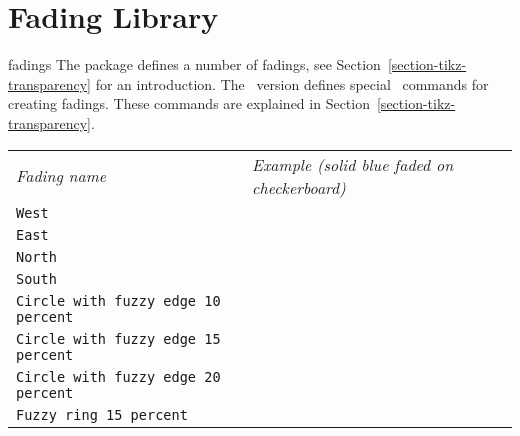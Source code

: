 %
%
%


\section{Fading Library}
\label{section-library-fadings}

\begin{pgflibrary}{fadings}
  The package defines a number of fadings, see
  Section~\ref{section-tikz-transparency} for an introduction.  The
  \tikzname\ version defines special \tikzname\ commands for creating
  fadings. These commands are explained in
  Section~\ref{section-tikz-transparency}.   
\end{pgflibrary}

\newcommand\fadingindex[1]{%
  \index{#1@\protect\texttt{#1} fading}%
  \index{Fadings!#1@\protect\texttt{#1}}%
  \texttt{#1}& 
  \begin{tikzpicture}[baseline=5mm-.5ex]
    \fill [black!20] (0,0) rectangle (1,1);
    \path [pattern=checkerboard,pattern color=black!30] (0,0) rectangle (1,1);

    \fill [path fading=#1,blue] (0,0) rectangle (1,1);
  \end{tikzpicture} \\[4.5mm]
}

\noindent
\begin{tabular}{ll}
  \emph{Fading name} & \emph{Example (solid blue faded on checkerboard)} \\[1mm]
  \fadingindex{West}  
  \fadingindex{East}  
  \fadingindex{North}  
  \fadingindex{South} 
  \fadingindex{Circle with fuzzy edge 10 percent} 
  \fadingindex{Circle with fuzzy edge 15 percent} 
  \fadingindex{Circle with fuzzy edge 20 percent} 
  \fadingindex{Fuzzy ring 15 percent} 
\end{tabular}


